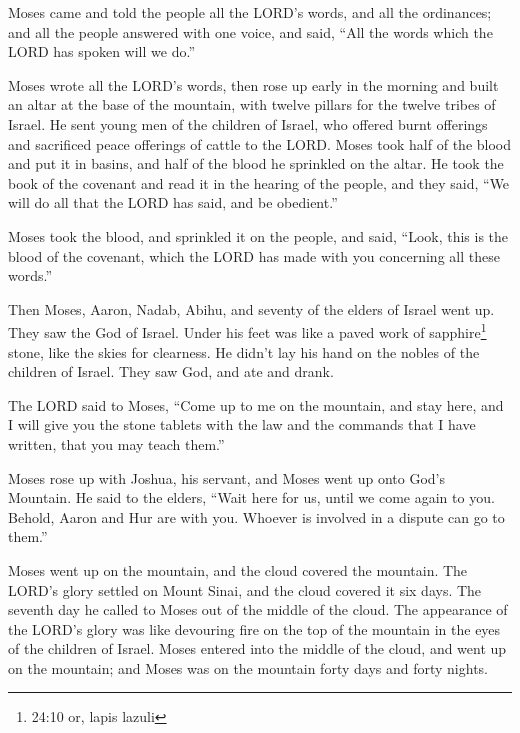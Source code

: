 \myverse{}Moses came and told the people all the LORD’s words, and all the
ordinances; and all the people answered with one voice, and said, “All the words which the LORD has spoken
will we do.”


\myverse{}Moses wrote all the LORD’s words, then rose up early in the morning
and built an altar at the base of the mountain, with twelve pillars for the twelve tribes of Israel.
\myverse{}He sent young men of the children of Israel, who offered burnt offerings and
sacrificed peace offerings of cattle to the LORD.
\myverse{}Moses took half of the blood and put it in basins, and half of the blood he
sprinkled on the altar.
\myverse{}He took the book of the covenant and read it in the hearing of the people,
and they said, “We will do all that the LORD has said, and be obedient.”


\myverse{}Moses took the blood, and sprinkled it on the people, and said,
“Look, this is the blood of the covenant, which the LORD has made with you concerning all these words.”


\myverse{}Then Moses, Aaron, Nadab, Abihu, and seventy of the elders of
Israel went up.
\myverse{}They saw the God of Israel. Under his feet was like a paved work of sapphire\footnote{24:10 or, lapis lazuli} stone, like the skies for clearness.
\myverse{}He didn’t lay his hand on the nobles of the children of Israel. They saw
God, and ate and drank.


\myverse{}The LORD said to Moses, “Come up to me on the mountain, and
stay here, and I will give you the stone tablets with the law and the commands that I have written, that
you may teach them.”


\myverse{}Moses rose up with Joshua, his servant, and Moses went up onto
God’s Mountain.
\myverse{}He said to the elders, “Wait here for us, until we come again to you. Behold,
Aaron and Hur are with you. Whoever is involved in a dispute can go to them.”


\myverse{}Moses went up on the mountain, and the cloud covered the mountain.
\myverse{}The LORD’s glory settled on Mount Sinai, and the cloud covered it six days.
The seventh day he called to Moses out of the middle of the cloud.
\myverse{}The appearance of the LORD’s glory was like devouring fire on the top of
the mountain in the eyes of the children of Israel.
\myverse{}Moses entered into the middle of the cloud, and went up on the mountain;
and Moses was on the mountain forty days and forty nights.


